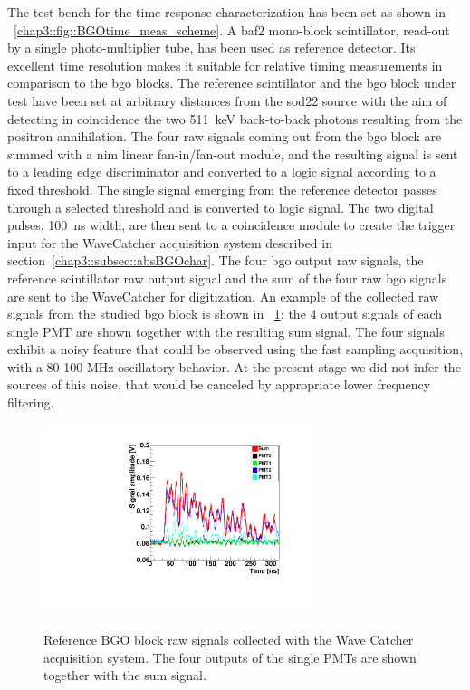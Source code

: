 The test-bench for the time response characterization has been set as shown in \figurename~\ref{chap3::fig::BGOtime_meas_scheme}. A \gls{baf2} mono-block scintillator, read-out by a single photo-multiplier tube, has been used as reference detector. Its excellent time resolution makes it suitable for relative timing measurements in comparison to the \gls{bgo} blocks. The reference scintillator and the \gls{bgo} block under test have been set at arbitrary distances from the \gls{sod22} source with the aim of detecting in coincidence the two 511~keV back-to-back photons resulting from the positron annihilation. The four raw signals coming out from the \gls{bgo} block are summed with a \gls{nim} linear fan-in/fan-out module, and the resulting signal is sent to a leading edge discriminator and converted to a logic signal according to a fixed threshold. The single signal emerging from the reference detector passes through a selected threshold and is converted to logic signal. The two digital pulses, 100~ns width, are then sent to a coincidence module to create the trigger input for the WaveCatcher acquisition system described in section~\ref{chap3::subsec::absBGOchar}. The four \gls{bgo} output raw signals, the reference scintillator raw output signal and the sum of the four raw \gls{bgo} signals are sent to the WaveCatcher for digitization. An example of the collected raw signals from the studied \gls{bgo} block is shown in \figurename~\ref{chap3::fig::raw_signal}: the 4 output signals of each single PMT are shown together with the resulting sum signal. The four signals exhibit a noisy feature that could be observed using the fast sampling acquisition, with a 80-100 MHz oscillatory behavior. At the present stage we did not infer the
sources of this noise, that would be canceled by appropriate lower frequency filtering.

\begin{figure} [!h]
\centering
{\includegraphics[width=0.7\textwidth]{03_GraphicFiles/chapter3_CLaRySproto/Absorber/images/raw_signalExample.pdf}}
\caption{Reference BGO block raw signals collected with the Wave Catcher acquisition system. The four outputs of the single PMTs are shown together with the sum signal.}
\label{chap3::fig::raw_signal}
\end{figure}


